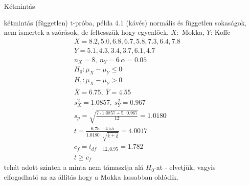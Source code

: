 \documentclass[12pt]{amsbook}
\begin{document}
\begin{spacing}{1.5}
\begin{section}{Kétmintás}
\begin{subsection}{kétmintás (független) t-próba, példa}
\label{2mtp}
   4.1 (kávés) normális és
   független sokaságok, nem ismertek a szórások, de feltesszük hogy egyenlőek.
   $X:$ Mokka, $Y$: Koffe
   \begin{gather*}
   X=8.2, 5.0, 6.8, 6.7, 5.8, 7.3, 6.4, 7.8\\
   Y=5.1, 4.3, 3.4, 3.7, 6.1, 4.7   \\
   n_X=8,\ n_Y=6\  \alpha=0.05 \\
   H_{0}: \mu_X-\mu_Y \le 0 \\
   H_{1}: \mu_X-\mu_Y > 0 \\
   \overline{X}=6.75,\ \overline{Y}=4.55\\
   s^2_X=1.0857,\ s^2_Y=0.967\\
   s_p=\sqrt{\frac{7\cdot1.0857+5\cdot0.967}{12}}=1.0180\\
   t=\frac{6.75-4.55}{1.0180\cdot\sqrt{\frac{1}{8}+\frac{1}{6}}} = 4.0017\\
   c_f=t_{df=12,0.95}=1.782\\
   t \ge c_f
   \end{gather*}
   tehát adott szinten a minta nem támasztja alá $H_0$-at - elvetjük, vagyis
   elfogadható az az állítás hogy a Mokka lassabban oldódik.
\end{subsection}%



\end{section}%































\end{spacing}
\end{document}
